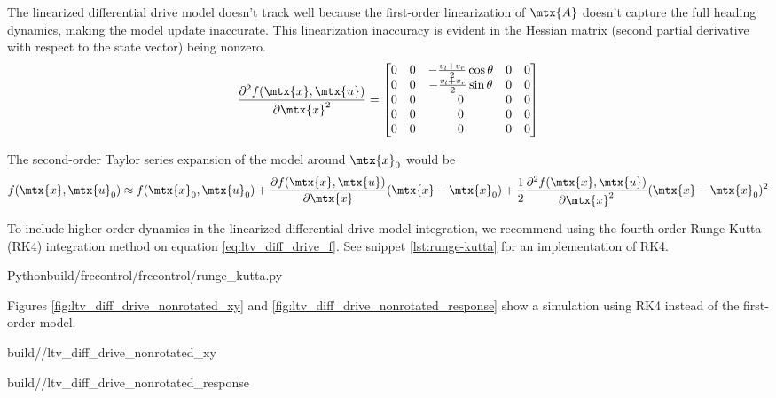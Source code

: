 The linearized differential drive model doesn't track well because the
first-order linearization of $\mtx{A}$ doesn't capture the full heading
dynamics, making the \gls{model} update inaccurate. This linearization
inaccuracy is evident in the Hessian matrix (second partial derivative with
respect to the state vector) being nonzero.
\begin{equation*}
  \frac{\partial^2 f(\mtx{x}, \mtx{u})}{\partial\mtx{x}^2} =
  \begin{bmatrix}
    0 & 0 & -\frac{v_l + v_r}{2}\cos\theta & 0 & 0 \\
    0 & 0 & -\frac{v_l + v_r}{2}\sin\theta & 0 & 0 \\
    0 & 0 & 0 & 0 & 0 \\
    0 & 0 & 0 & 0 & 0 \\
    0 & 0 & 0 & 0 & 0
  \end{bmatrix}
\end{equation*}

The second-order Taylor series expansion of the \gls{model} around $\mtx{x}_0$
would be
\begin{equation*}
  f(\mtx{x}, \mtx{u}_0) \approx f(\mtx{x}_0, \mtx{u}_0) +
    \frac{\partial f(\mtx{x}, \mtx{u})}{\partial\mtx{x}}(\mtx{x} - \mtx{x}_0) +
    \frac{1}{2}\frac{\partial^2 f(\mtx{x}, \mtx{u})}{\partial\mtx{x}^2}
    (\mtx{x} - \mtx{x}_0)^2
\end{equation*}

To include higher-order dynamics in the linearized differential drive model
integration, we recommend using the fourth-order Runge-Kutta (RK4) integration
method on equation \eqref{eq:ltv_diff_drive_f}. See snippet
\ref{lst:runge-kutta} for an implementation of RK4.
\begin{code}{Python}{build/frccontrol/frccontrol/runge_kutta.py}
  \caption{Fourth-order Runge-Kutta integration in Python}
  \label{lst:runge-kutta}
\end{code}

Figures \ref{fig:ltv_diff_drive_nonrotated_xy} and
\ref{fig:ltv_diff_drive_nonrotated_response} show a simulation using RK4
instead of the first-order \gls{model}.
\begin{bookfigure}
  \begin{minisvg}{2}{build/\chapterpath/ltv_diff_drive_nonrotated_xy}
    \caption{Linear time-varying differential drive controller (global reference
        frame formulation) x-y plot}
    \label{fig:ltv_diff_drive_nonrotated_xy}
  \end{minisvg}
  \hfill
  \begin{minisvg}{2}{build/\chapterpath/ltv_diff_drive_nonrotated_response}
    \caption{Linear time-varying differential drive controller (global reference
        frame formulation) response}
    \label{fig:ltv_diff_drive_nonrotated_response}
  \end{minisvg}
\end{bookfigure}

